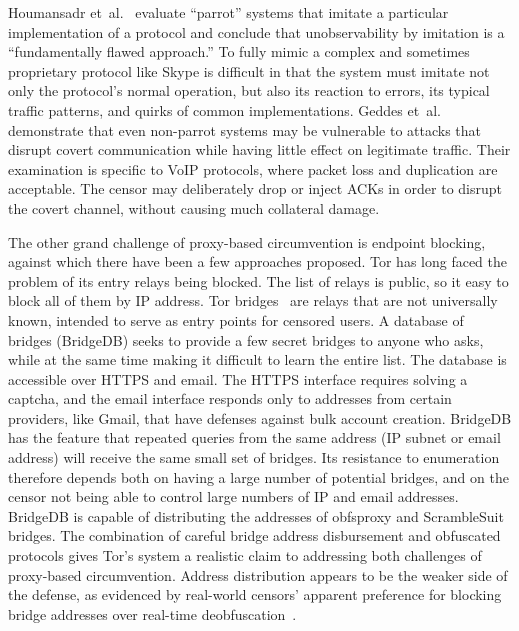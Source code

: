 \documentclass{article}
\begin{document}
Houmansadr et~al.~\cite{parrot} evaluate ``parrot'' systems that imitate a particular implementation of a protocol
and conclude that unobservability by imitation is a ``fundamentally
flawed approach.''
To fully mimic a complex and sometimes proprietary protocol like Skype
is difficult in that the system must imitate not only the protocol's normal operation, but also its reaction to errors,
its typical traffic patterns, and quirks of common implementations.
Geddes et~al.~\cite{acks}
demonstrate that even non-parrot systems may be vulnerable to
attacks that disrupt covert communication while having little effect
on legitimate traffic. Their examination is specific to VoIP protocols,
where packet loss and duplication are acceptable. The censor may
deliberately drop or inject ACKs in order to disrupt the covert channel, without causing
much collateral damage.


The other grand challenge of proxy-based circumvention is endpoint blocking,
against which there have been a few approaches proposed.
Tor has long faced the problem of its entry relays being blocked. The list of
relays is public, so it easy to block all of them by IP address. Tor
bridges~\cite{tor-blocking} are relays that are not universally known, intended
to serve as entry points for censored users. A database of bridges (BridgeDB) seeks to
provide a few secret bridges to anyone who asks, while at the same time making it
difficult to learn the entire list.
The database is accessible over HTTPS and email.
The HTTPS interface requires solving a captcha,
and the email interface responds only to addresses from certain providers, like Gmail,
that have defenses against bulk account creation.
BridgeDB has the feature that repeated queries from the same address
(IP subnet or email address) will receive the same small set of bridges.
Its resistance to enumeration therefore depends both on
having a large number of potential bridges,
and on the censor not being able to control large numbers of IP and email addresses.
BridgeDB is capable of distributing
the addresses of obfsproxy and ScrambleSuit bridges.
The combination
of careful bridge address disbursement and obfuscated protocols
gives Tor's system a realistic claim to addressing both challenges of proxy-based circumvention.
Address distribution appears to be the weaker side of the defense,
as evidenced by real-world censors' apparent preference for
blocking bridge addresses over real-time deobfuscation~\cite{foci12-winter}.
\end{document}
